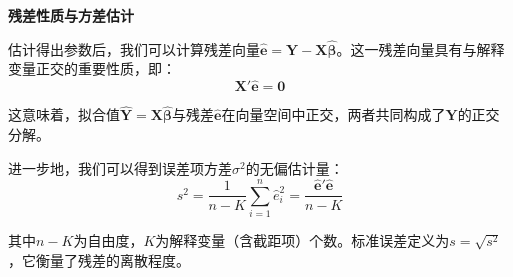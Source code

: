 \textbf{残差性质与方差估计}

估计得出参数后，我们可以计算残差向量$\hat{\mathbf{e}} = \mathbf{Y} - \mathbf{X}\hat{\boldsymbol{\beta}}$。这一残差向量具有与解释变量正交的重要性质，即：
\begin{equation}
\mathbf{X}'\hat{\mathbf{e}} = \mathbf{0}
\end{equation}

这意味着，拟合值$\hat{\mathbf{Y}} = \mathbf{X}\hat{\boldsymbol{\beta}}$与残差$\hat{\mathbf{e}}$在向量空间中正交，两者共同构成了$\mathbf{Y}$的正交分解。

进一步地，我们可以得到误差项方差$\sigma^2$的无偏估计量：
\begin{equation}
	s^2 = \frac{1}{n-K} \sum_{i=1}^n \hat{e}_i^2 = \frac{\hat{\mathbf{e}}'\hat{\mathbf{e}}}{n-K}
\end{equation}

其中$n-K$为自由度，$K$为解释变量（含截距项）个数。标准误差定义为$s = \sqrt{s^2}$，它衡量了残差的离散程度。

